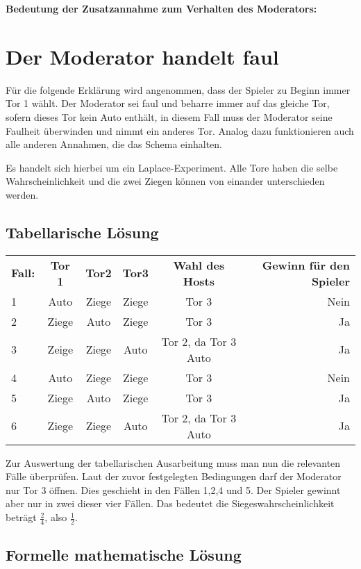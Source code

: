 \newpage
\textbf{Bedeutung der Zusatzannahme zum Verhalten des Moderators:}

\section{Der Moderator handelt faul}

Für die folgende Erklärung wird angenommen, dass der Spieler zu Beginn immer Tor 1 wählt. Der Moderator sei faul und beharre immer auf das gleiche Tor, sofern dieses
Tor kein Auto enthält, in diesem Fall muss der Moderator seine Faulheit überwinden und nimmt ein anderes Tor. Analog dazu funktionieren auch alle anderen Annahmen,
die das Schema einhalten.

Es handelt sich hierbei um ein Laplace-Experiment. Alle Tore haben die selbe Wahrscheinlichkeit und die zwei Ziegen können von einander unterschieden werden. 

\subsection{Tabellarische Lösung}


\begin{tabular}[h]{lccccr}
    \textbf{Fall:} & \textbf{Tor 1} & \textbf{Tor2} & \textbf{Tor3} & \textbf{Wahl des Hosts} & \textbf{Gewinn für den Spieler} \\
    1 & Auto & Ziege & Ziege & Tor 3 & Nein\\
    2 & Ziege & Auto & Ziege & Tor 3 & Ja\\
    3 & Zeige & Ziege & Auto & Tor 2, da Tor 3 Auto & Ja\\
    4 & Auto & Ziege & Ziege & Tor 3 & Nein\\
    5 & Ziege & Auto & Ziege & Tor 3 & Ja\\
    6 & Ziege & Ziege & Auto & Tor 2, da Tor 3 Auto & Ja\\
\end{tabular}

Zur Auswertung der tabellarischen Ausarbeitung muss man nun die relevanten Fälle überprüfen. Laut der zuvor festgelegten Bedingungen darf der Moderator nur Tor 3 öffnen.
Dies geschieht in den Fällen 1,2,4 und 5. Der Spieler gewinnt aber nur in zwei dieser vier Fällen. Das bedeutet die Siegeswahrscheinlichkeit beträgt $\frac{2}{4}$,
also $\frac{1}{2}$.

\newpage
\subsection{Formelle mathematische Lösung}


